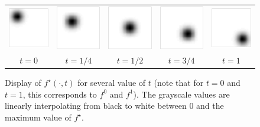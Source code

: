 \begin{figure}[!ht]
\begin{center}
\begin{tabular}{ccccc}
\includegraphics[width=2.5cm]{images/bump_betaold/bump_beta1_01}&
\includegraphics[width=2.5cm]{images/bump_betaold/bump_beta1_09}&
\includegraphics[width=2.5cm]{images/bump_betaold/bump_beta1_17}&
\includegraphics[width=2.5cm]{images/bump_betaold/bump_beta1_25}&
\includegraphics[width=2.5cm]{images/bump_betaold/bump_beta1_33}\\
$t=0$&$t=1/4$&$t=1/2$&$t=3/4$&$t=1$ %
\end{tabular}
\caption{\label{fig:data_bump} 
Display of $f^\star(\cdot,t)$ for several value of $t$ (note that for $t=0$ and $t=1$, this corresponds to $f^0$ and $f^1$). The grayscale values are linearly interpolating from black to white between 0 and the maximum value of $f^\star$. 
}
\end{center}
\vspace{3mm}
\end{figure}

